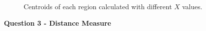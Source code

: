 \documentclass[12pt,a4paper]{article}
\begin{document}
\begin{figure}[!h]
{{		}
		\label{fig:cent06}
	}
	\quad
	\quad
	\caption{Centroids of each region calculated with different $X$ values.}
	\label{fig:cent}
\end{figure}


\newpage

\textbf{\LARGE Question 3 - Distance Measure} \\
\end{document}
